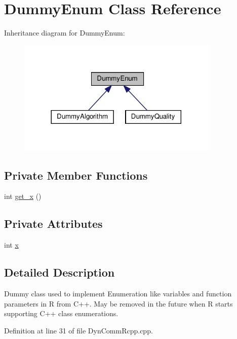 \hypertarget{classDummyEnum}{}\section{Dummy\+Enum Class Reference}
\label{classDummyEnum}


Inheritance diagram for Dummy\+Enum\+:
\nopagebreak
\begin{figure}[H]
\begin{center}
\leavevmode
\includegraphics[width=272pt]{classDummyEnum__inherit__graph}
\end{center}
\end{figure}
\subsection*{Private Member Functions}
\begin{DoxyCompactItemize}
\item 
int \hyperlink{classDummyEnum_a527da769af75620d1443857d2f300433}{get\+\_\+x} ()
\end{DoxyCompactItemize}
\subsection*{Private Attributes}
\begin{DoxyCompactItemize}
\item 
int \hyperlink{classDummyEnum_a0ad78287e6a1d56038b13370f313946c}{x}
\end{DoxyCompactItemize}


\subsection{Detailed Description}
Dummy class used to implement Enumeration like variables and function parameters in R from C++. May be removed in the future when R starts supporting C++ class enumerations. 

Definition at line 31 of file Dyn\+Comm\+Rcpp.\+cpp.



